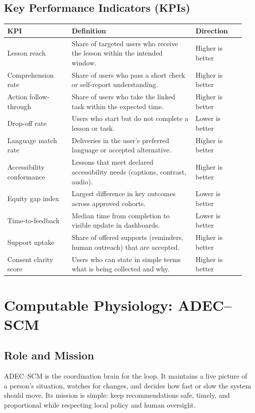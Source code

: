 \documentclass[12pt]{article}
\begin{document}
\subsection*{Key Performance Indicators (KPIs)}
\begin{longtable}{@{}p{0.26\linewidth}p{0.50\linewidth}p{0.20\linewidth}@{}}
\toprule
\textbf{KPI} & \textbf{Definition} & \textbf{Direction} \\
\midrule
\endhead
Lesson reach & Share of targeted users who receive the lesson within the intended window. & Higher is better \\
Comprehension rate & Share of users who pass a short check or self-report understanding. & Higher is better \\
Action follow-through & Share of users who take the linked task within the expected time. & Higher is better \\
Drop-off rate & Users who start but do not complete a lesson or task. & Lower is better \\
Language match rate & Deliveries in the user’s preferred language or accepted alternative. & Higher is better \\
Accessibility conformance & Lessons that meet declared accessibility needs (captions, contrast, audio). & Higher is better \\
Equity gap index & Largest difference in key outcomes across approved cohorts. & Lower is better \\
Time-to-feedback & Median time from completion to visible update in dashboards. & Lower is better \\
Support uptake & Share of offered supports (reminders, human outreach) that are accepted. & Higher is better \\
Consent clarity score & Users who can state in simple terms what is being collected and why. & Higher is better \\
\bottomrule
\end{longtable}


\section{Computable Physiology: ADEC–SCM}

\subsection*{Role and Mission}
ADEC–SCM is the coordination brain for the loop. It maintains a live picture of a person’s situation, watches for changes, and decides how fast or slow the system should move. Its mission is simple: keep recommendations safe, timely, and proportional while respecting local policy and human oversight.
\end{document}
